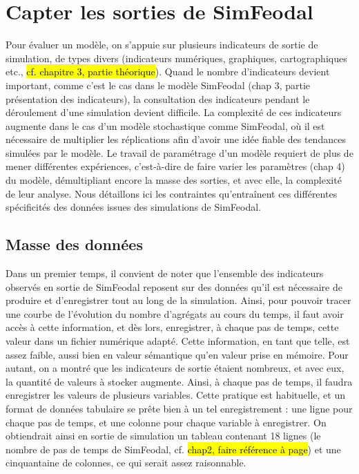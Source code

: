 \clearpage
\section[Capter les sorties de SimFeodal]{{Capter les sorties de SimFeodal}%
	}\label{sec:sorties-simfeodal}

Pour évaluer un modèle, on s'appuie sur plusieurs indicateurs de sortie de simulation, de types divers (indicateurs numériques, graphiques, cartographiques etc., \hl{cf. chapitre 3, partie théorique}).
Quand le nombre d'indicateurs devient important, comme c'est le cas dans le modèle SimFeodal (chap 3, partie présentation des indicateurs), la consultation des indicateurs pendant le déroulement d'une simulation devient difficile.
La complexité de ces indicateurs augmente dans le cas d'un modèle stochastique comme SimFeodal, où il est nécessaire de multiplier les réplications afin d'avoir une idée fiable des tendances simulées par le modèle.
Le travail de paramétrage d'un modèle requiert de plus de mener différentes expériences, c'est-à-dire de faire varier les paramètres (chap 4) du modèle, démultipliant encore la masse des sorties, et avec elle, la complexité de leur analyse.
Nous détaillons ici les contraintes qu'entraînent ces différentes spécificités des données issues des simulations de SimFeodal.

	\subsection{Masse des données}
	Dans un premier temps, il convient de noter que l'ensemble des indicateurs observés en sortie de SimFeodal reposent sur des données qu'il est nécessaire de produire et d'enregistrer tout au long de la simulation.
	Ainsi, pour pouvoir tracer une courbe de l'évolution du nombre d'agrégats au cours du temps, il faut avoir accès à cette information, et dès lors, enregistrer, à chaque pas de temps, cette valeur dans un fichier numérique adapté.
	Cette information, en tant que telle, est assez faible, aussi bien en valeur sémantique qu'en valeur prise en mémoire.
	Pour autant, on a montré que les indicateurs de sortie étaient nombreux, et avec eux, la quantité de valeurs à stocker augmente.
	Ainsi, à chaque pas de temps, il faudra enregistrer les valeurs de plusieurs variables.
	Cette pratique est habituelle, et un format de données tabulaire se prête bien à un tel enregistrement : une ligne pour chaque pas de temps, et une colonne pour chaque variable à enregistrer.
	On obtiendrait ainsi en sortie de simulation un tableau contenant 18 lignes (le nombre de pas de temps de SimFeodal, cf. \hl{chap2, faire référence à page}) et une cinquantaine de colonnes, ce qui serait assez raisonnable.

